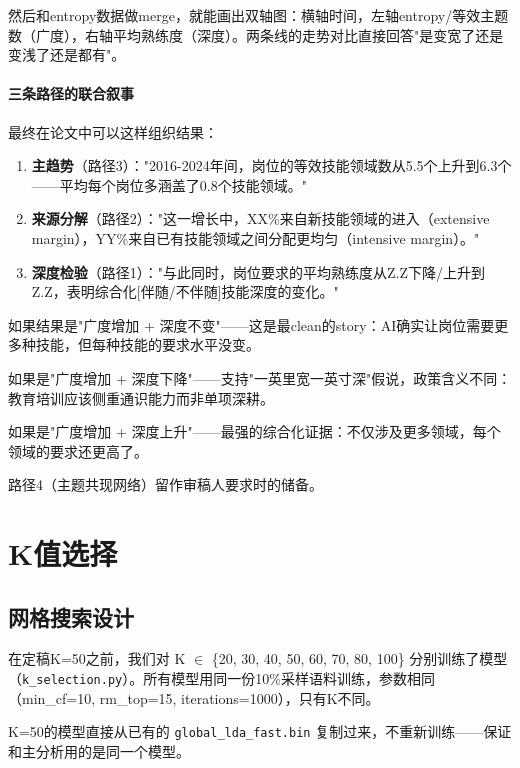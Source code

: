\documentclass[12pt,a4paper]{ctexart}
\begin{document}
然后和entropy数据做merge，就能画出双轴图：横轴时间，左轴entropy/等效主题数（广度），右轴平均熟练度（深度）。两条线的走势对比直接回答"是变宽了还是变浅了还是都有"。

\paragraph{三条路径的联合叙事}

最终在论文中可以这样组织结果：

\begin{enumerate}
\item \textbf{主趋势}（路径3）："2016-2024年间，岗位的等效技能领域数从5.5个上升到6.3个——平均每个岗位多涵盖了0.8个技能领域。"
\item \textbf{来源分解}（路径2）："这一增长中，XX\%来自新技能领域的进入（extensive margin），YY\%来自已有技能领域之间分配更均匀（intensive margin）。"
\item \textbf{深度检验}（路径1）："与此同时，岗位要求的平均熟练度从Z.Z下降/上升到Z.Z，表明综合化[伴随/不伴随]技能深度的变化。"
\end{enumerate}

如果结果是"广度增加 + 深度不变"——这是最clean的story：AI确实让岗位需要更多种技能，但每种技能的要求水平没变。

如果是"广度增加 + 深度下降"——支持"一英里宽一英寸深"假说，政策含义不同：教育培训应该侧重通识能力而非单项深耕。

如果是"广度增加 + 深度上升"——最强的综合化证据：不仅涉及更多领域，每个领域的要求还更高了。

路径4（主题共现网络）留作审稿人要求时的储备。


\section{K值选择}
\label{sec:k-selection}

\subsection{网格搜索设计}

在定稿K=50之前，我们对 K $\in$ \{20, 30, 40, 50, 60, 70, 80, 100\} 分别训练了模型（\texttt{k\_selection.py}）。所有模型用同一份10\%采样语料训练，参数相同（min\_cf=10, rm\_top=15, iterations=1000），只有K不同。

K=50的模型直接从已有的 \texttt{global\_lda\_fast.bin} 复制过来，不重新训练——保证和主分析用的是同一个模型。
\end{document}
